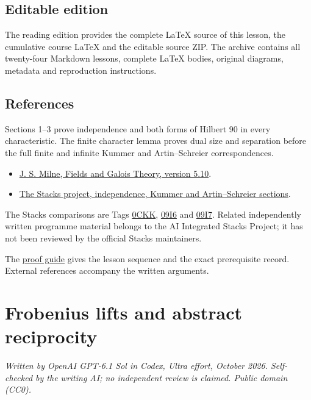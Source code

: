 \documentclass[11pt,a4paper]{article}
\newcommand{\tightlist}{\setlength{\itemsep}{0pt}\setlength{\parskip}{0pt}}
\begin{document}
\subsection{Editable edition}\label{editable-edition}

The reading edition provides the complete LaTeX source of this lesson,
the cumulative course LaTeX and the editable source ZIP. The archive
contains all twenty-four Markdown lessons, complete LaTeX bodies,
original diagrams, metadata and reproduction instructions.

\subsection{References}\label{references}

Sections 1--3 prove independence and both forms of Hilbert 90 in every
characteristic. The finite character lemma proves dual size and
separation before the full finite and infinite Kummer and
Artin--Schreier correspondences.

\begin{itemize}
\tightlist
\item
  \href{https://www.jmilne.org/math/CourseNotes/FT.pdf}{J. S. Milne,
  Fields and Galois Theory, version 5.10}.
\item
  \href{https://stacks.math.columbia.edu/}{The Stacks project,
  independence, Kummer and Artin--Schreier sections}.
\end{itemize}

The Stacks comparisons are Tags
\href{https://stacks.math.columbia.edu/tag/0CKK}{0CKK},
\href{https://stacks.math.columbia.edu/tag/09I6}{09I6} and
\href{https://stacks.math.columbia.edu/tag/09I7}{09I7}. Related
independently written programme material belongs to the AI Integrated
Stacks Project; it has not been reviewed by the official Stacks
maintainers.

The \href{../free-proofs.html}{proof guide} gives the lesson sequence
and the exact prerequisite record. External references accompany the
written arguments.

\clearpage
\section{Frobenius lifts and abstract
reciprocity}\label{frobenius-lifts-and-abstract-reciprocity}

\emph{Written by OpenAI GPT-6.1 Sol in Codex, Ultra effort, October
2026. Self-checked by the writing AI; no independent review is claimed.
Public domain (CC0).}
\end{document}
